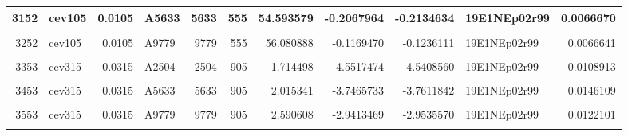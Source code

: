 \documentclass[
]{book}
\begin{document}
\begin{table}[!h]
{\begin{tabular}{r|l|r|l|r|r|r|r|r|l|r}
\hline
3152 & cev105 & 0.0105 & A5633 & 5633 & 555 & 54.593579 & -0.2067964 & -0.2134634 & 19E1NEp02r99 & 0.0066670\\
\hline
\cellcolor{gray!6}{3202} & \cellcolor{gray!6}{cev105} & \cellcolor{gray!6}{0.0105} & \cellcolor{gray!6}{A7274} & \cellcolor{gray!6}{7274} & \cellcolor{gray!6}{555} & \cellcolor{gray!6}{55.109790} & \cellcolor{gray!6}{-0.1740126} & \cellcolor{gray!6}{-0.1806320} & \cellcolor{gray!6}{19E1NEp02r99} & \cellcolor{gray!6}{0.0066194}\\
\hline
3252 & cev105 & 0.0105 & A9779 & 9779 & 555 & 56.080888 & -0.1169470 & -0.1236111 & 19E1NEp02r99 & 0.0066641\\
\hline
\cellcolor{gray!6}{3603} & \cellcolor{gray!6}{cev526} & \cellcolor{gray!6}{0.0526} & \cellcolor{gray!6}{A0} & \cellcolor{gray!6}{0} & \cellcolor{gray!6}{905} & \cellcolor{gray!6}{1.533025} & \cellcolor{gray!6}{-5.2530406} & \cellcolor{gray!6}{-5.2486887} & \cellcolor{gray!6}{19E1NEp02r99} & \cellcolor{gray!6}{0.0043519}\\
\hline
3353 & cev315 & 0.0315 & A2504 & 2504 & 905 & 1.714498 & -4.5517474 & -4.5408560 & 19E1NEp02r99 & 0.0108913\\
\hline
\cellcolor{gray!6}{3403} & \cellcolor{gray!6}{cev315} & \cellcolor{gray!6}{0.0315} & \cellcolor{gray!6}{A4145} & \cellcolor{gray!6}{4145} & \cellcolor{gray!6}{905} & \cellcolor{gray!6}{1.860521} & \cellcolor{gray!6}{-4.1039608} & \cellcolor{gray!6}{-4.1072736} & \cellcolor{gray!6}{19E1NEp02r99} & \cellcolor{gray!6}{0.0033128}\\
\hline
3453 & cev315 & 0.0315 & A5633 & 5633 & 905 & 2.015341 & -3.7465733 & -3.7611842 & 19E1NEp02r99 & 0.0146109\\
\hline
\cellcolor{gray!6}{3503} & \cellcolor{gray!6}{cev315} & \cellcolor{gray!6}{0.0315} & \cellcolor{gray!6}{A7274} & \cellcolor{gray!6}{7274} & \cellcolor{gray!6}{905} & \cellcolor{gray!6}{2.215003} & \cellcolor{gray!6}{-3.4101025} & \cellcolor{gray!6}{-3.4235413} & \cellcolor{gray!6}{19E1NEp02r99} & \cellcolor{gray!6}{0.0134388}\\
\hline
3553 & cev315 & 0.0315 & A9779 & 9779 & 905 & 2.590608 & -2.9413469 & -2.9535570 & 19E1NEp02r99 & 0.0122101\\
\hline
\cellcolor{gray!6}{3004} & \cellcolor{gray!6}{cev105} & \cellcolor{gray!6}{0.0105} & \cellcolor{gray!6}{A0} & \cellcolor{gray!6}{0} & \cellcolor{gray!6}{953} & \cellcolor{gray!6}{20.125381} & \cellcolor{gray!6}{-1.3249909} & \cellcolor{gray!6}{-1.3290865} & \cellcolor{gray!6}{19E1NEp02r99} & \cellcolor{gray!6}{0.0040957}\\

\end{tabular}}
\end{table}
\end{document}

